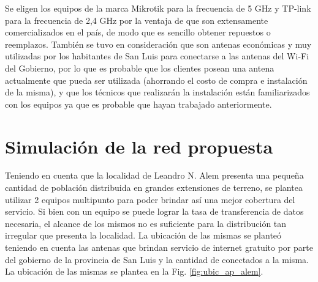\documentclass[11pt,a4paper]{article}
\begin{document}
\begin{table}[htbp]
  \caption{características de CPE para 2.4 GHz.}
  \label{tab:carac_CPE_24}%
\end{table}%


Se eligen los equipos de la marca Mikrotik para la frecuencia de 5 GHz y TP-link para la frecuencia de 2,4 GHz por la ventaja de que son extensamente comercializados en el país, de modo que es sencillo obtener repuestos o reemplazos.
También se tuvo en consideración que son antenas económicas y muy utilizadas por los habitantes de San Luis para conectarse a las antenas del Wi-Fi del Gobierno, por lo que es probable que los clientes posean una antena actualmente que pueda ser utilizada (ahorrando el costo de compra e instalación de la misma), y que los técnicos que realizarán la instalación están familiarizados con los equipos ya que es probable que hayan trabajado anteriormente.



\section{Simulación de la red propuesta}

Teniendo en cuenta que la localidad de Leandro N. Alem presenta una pequeña cantidad de población distribuida en grandes extensiones de terreno, se plantea utilizar 2 equipos multipunto para poder brindar así una mejor cobertura del servicio. 
Si bien con un equipo se puede lograr la tasa de transferencia de datos necesaria, el alcance de los mismos no es suficiente para la distribución tan irregular que presenta la localidad. 
La ubicación de las mismas se planteó teniendo en cuenta las antenas que brindan servicio de internet gratuito por parte del gobierno de la provincia de San Luis y la cantidad de conectados a la misma. 
La ubicación de las mismas se plantea en la Fig. \ref{fig:ubic_ap_alem}.
\end{document}

